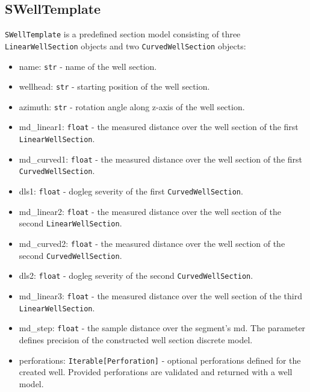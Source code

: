 \subsection{SWellTemplate}
\texttt{SWellTemplate} is a predefined section model consisting of three \texttt{LinearWellSection} objects and two \texttt{CurvedWellSection} objects:
\begin{itemize}
	\item  \colorbox{gray!20}{name:} \texttt{str} - name of the well section.
	\item  \colorbox{gray!20}{wellhead:} \texttt{str} - starting position of the well section.
	\item  \colorbox{gray!20}{azimuth:} \texttt{str} - rotation angle along z-axis of the well section.
	\item  \colorbox{gray!20}{md\_linear1:} \texttt{float} - the measured distance over the well section of the first \texttt{LinearWellSection}.
	\item  \colorbox{gray!20}{md\_curved1:} \texttt{float} - the measured distance over the well section of the first \texttt{CurvedWellSection}.
	\item  \colorbox{gray!20}{dls1:} \texttt{float} - dogleg severity of the first \texttt{CurvedWellSection}.
	\item  \colorbox{gray!20}{md\_linear2:} \texttt{float} - the measured distance over the well section of the second \texttt{LinearWellSection}.
	\item  \colorbox{gray!20}{md\_curved2:} \texttt{float} - the measured distance over the well section of the second \texttt{CurvedWellSection}.
	\item  \colorbox{gray!20}{dls2:} \texttt{float} - dogleg severity of the second \texttt{CurvedWellSection}.
	\item  \colorbox{gray!20}{md\_linear3:} \texttt{float} - the measured distance over the well section of the third \texttt{LinearWellSection}.
	\item  \colorbox{gray!20}{md\_step:} \texttt{float} - the sample distance over the segment's md. The parameter defines precision of the constructed well section discrete model.
	\item  \colorbox{gray!20}{perforations:} \texttt{Iterable[Perforation]} - optional perforations defined for the created well. Provided perforations are validated and returned with a well model.
\end{itemize}
